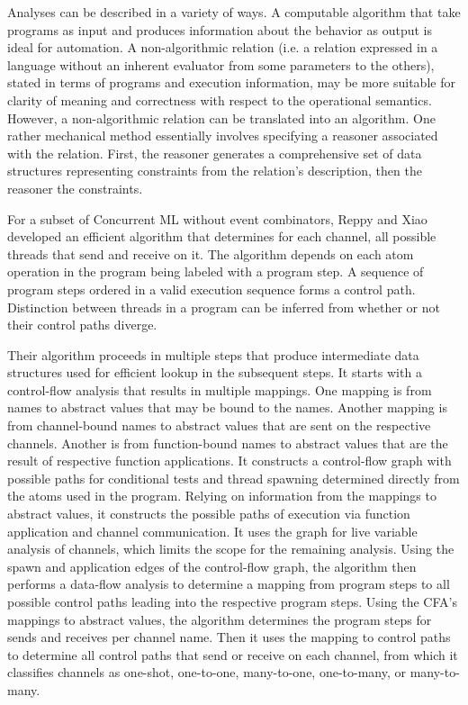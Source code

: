 \documentclass[letterpaper, 11pt]{extarticle}
\begin{document}
Analyses can be described in a variety of ways. A computable algorithm that take programs
as input and produces information about the behavior as output is ideal for automation. A
non-algorithmic relation (i.e. a relation expressed in a language without an inherent evaluator
from some parameters to the others),
stated in terms of programs and execution information, may be
more suitable for clarity of meaning and correctness with respect to the operational
semantics. However, a non-algorithmic relation can be translated into an algorithm.
One rather mechanical method essentially involves
specifying a reasoner associated with the relation. 
First, the reasoner generates a comprehensive set of data structures representing
constraints from the relation's description, then the reasoner the constraints.

For a subset of Concurrent ML without event combinators, Reppy and Xiao developed an
efficient algorithm that determines for each channel, all possible threads that send
and receive on it. The algorithm depends on each atom operation in the program being
labeled with a program step. A sequence of program steps ordered in a valid execution
sequence forms a control path. Distinction between threads in a program can be inferred from
whether or not their control paths diverge.  

Their algorithm proceeds in multiple steps that produce intermediate data structures used for
efficient lookup in the subsequent steps. It starts with a control-flow analysis that
results in multiple mappings. One mapping is from names to abstract values that may be bound to
the names. Another mapping is from channel-bound names to abstract values that are
sent on the respective channels. Another is from function-bound names to abstract values
that are the result of respective function applications.  It constructs a control-flow graph 
with possible paths for conditional tests and thread spawning determined directly from the
atoms used in the program. Relying on information from the mappings to abstract values,
it constructs the possible paths of execution via function application and channel
communication.  It uses the graph for live variable analysis of channels, which limits the
scope for the remaining analysis.  Using the spawn and application edges of the control-flow
graph, the algorithm then performs a data-flow analysis to determine a mapping from program
steps to all possible control paths leading into the respective program steps.  Using the
CFA's mappings to abstract values, the algorithm determines the program steps for sends and
receives per channel name.  Then it uses the mapping to control paths to determine all
control paths that send or receive on each channel, from which it classifies channels as
one-shot, one-to-one, many-to-one, one-to-many, or many-to-many.
\end{document}
